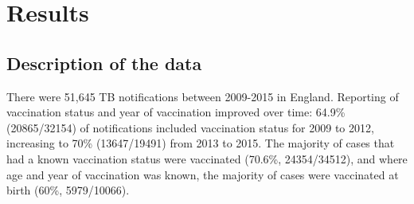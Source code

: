 \documentclass[11pt,twoside]{bristolthesis}
\begin{document}
  \hypertarget{results-1}{%
  \section{Results}\label{results-1}}
  
  \hypertarget{description-of-the-data}{%
  \subsection{Description of the data}\label{description-of-the-data}}
  
  There were 51,645 TB notifications between 2009-2015 in England. Reporting of vaccination status and year of vaccination improved over time: 64.9\% (20865/32154) of notifications included vaccination status for 2009 to 2012, increasing to 70\% (13647/19491) from 2013 to 2015. The majority of cases that had a known vaccination status were vaccinated (70.6\%, 24354/34512), and where age and year of vaccination was known, the majority of cases were vaccinated at birth (60\%, 5979/10066).
  
\end{document}
